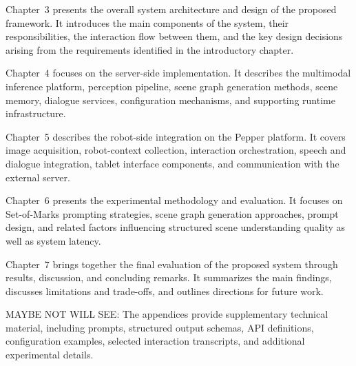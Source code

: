 Chapter~3 presents the overall system architecture and design of the proposed framework. It introduces the main components of the system, their responsibilities, the interaction flow between them, and the key design decisions arising from the requirements identified in the introductory chapter.

Chapter~4 focuses on the server-side implementation. It describes the multimodal inference platform, perception pipeline, scene graph generation methods, scene memory, dialogue services, configuration mechanisms, and supporting runtime infrastructure.

Chapter~5 describes the robot-side integration on the Pepper platform. It covers image acquisition, robot-context collection, interaction orchestration, speech and dialogue integration, tablet interface components, and communication with the external server.

Chapter~6 presents the experimental methodology and evaluation. It focuses on Set-of-Marks prompting strategies, scene graph generation approaches, prompt design, and related factors influencing structured scene understanding quality as well as system latency.

Chapter~7 brings together the final evaluation of the proposed system through results, discussion, and concluding remarks. It summarizes the main findings, discusses limitations and trade-offs, and outlines directions for future work.

MAYBE NOT WILL SEE: The appendices provide supplementary technical material, including prompts, structured output schemas, API definitions, configuration examples, selected interaction transcripts, and additional experimental details.
